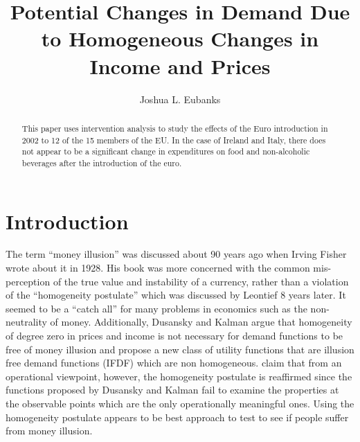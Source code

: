 \documentclass{paper}
\begin{document}
\title{Potential Changes in Demand Due to Homogeneous Changes in Income and Prices} 
\author{Joshua L. Eubanks}


\maketitle
    \begin{abstract}

        This paper uses intervention analysis to study the effects of the Euro introduction in 2002 to 12 of the 15 members of the EU. In the case of Ireland and Italy, there does not appear to be a significant change in expenditures on food and non-alcoholic beverages after the introduction of the euro. 
    \end{abstract}


\section{Introduction}
The term ``money illusion'' was discussed about 90 years ago when Irving Fisher wrote about it in 1928. His book was more concerned with the common mis-perception of the true value and instability of a currency, rather than a violation of the ``homogeneity postulate'' which was discussed by Leontief 8 years later. It seemed to be a ``catch all'' for many problems in economics such as the non-neutrality of money. Additionally, Dusansky and Kalman argue that homogeneity of degree zero in prices and income is not necessary for demand functions to be free of money illusion and propose a new class of utility functions that are illusion free demand functions (IFDF) which are non homogeneous. \cite{howipati1980b} claim that from an operational viewpoint, however, the homogeneity postulate is reaffirmed since the functions proposed by Dusansky and Kalman fail to examine the properties at the observable points which are the only operationally meaningful ones. Using the homogeneity postulate appears to be best approach to test to see if people suffer from money illusion. 
\end{document}
